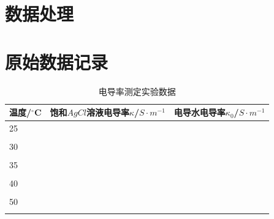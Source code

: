 \documentclass[a4paper]{article}
\begin{document}
\section{数据处理}


\newpage
\section{原始数据记录}
\begin{table}[H]
	\caption{电导率测定实验数据}
	\begin{center}
		\begin{tabular}{l|l|l}
			\hline
			温度/$^\circ$C \quad\quad\quad\quad\quad 	&饱和$AgCl$溶液电导率$\kappa$/$S\cdot m^{-1}$\quad\quad\quad\quad\quad & 电导水电导率$\kappa_{0}$/$S\cdot m^{-1}$\\
			\hline
			25&&\\
			&&\\
			\hline
			30&&\\
			&&\\
			\hline
			35&&\\
			&&\\
			\hline
			40&&\\
			&&\\
			\hline
			50&&\\
			&&\\
			\hline
		 \end{tabular}
	\end{center}
\end{table}
\end{document}
